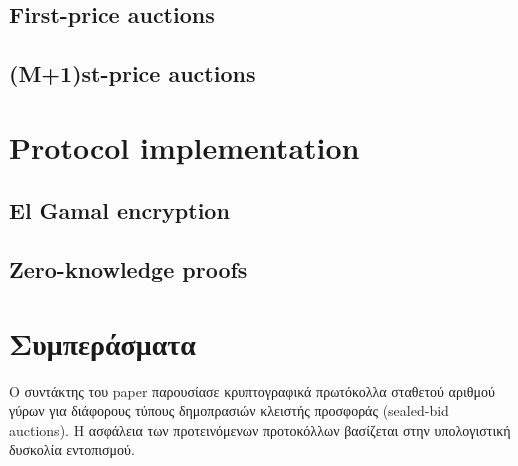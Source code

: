 \documentclass[a4paper,11pt]{article}
\begin{document}
	\subsection{First-price auctions}
	\subsection{(M+1)st-price auctions}

\section{Protocol implementation}

	\subsection{El Gamal encryption}
	\subsection{Zero-knowledge proofs}

\section{Συμπεράσματα} 
Ο συντάκτης του paper παρουσίασε κρυπτογραφικά πρωτόκολλα σταθετού αριθμού γύρων για διάφορους τύπους
δημοπρασιών κλειστής προσφοράς (sealed-bid auctions). Η ασφάλεια των προτεινόμενων προτοκόλλων βασίζεται στην
υπολογιστική δυσκολία εντοπισμού.
\end{document}
